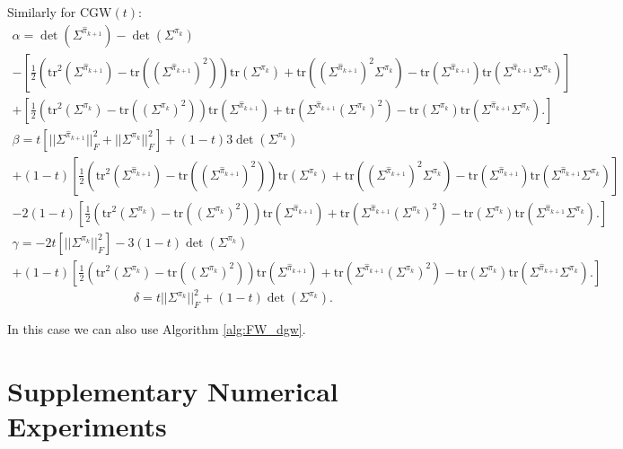 \documentclass{article}
\newcommand{\1}{\mathbf{1}}
\newcommand{\CGW}{\mathrm{CGW}}
\theoremstyle{definition}
\theoremstyle{remark}
\begin{document}
\begin{appendices}
Similarly for $\CGW(t)$:
\begin{multline*}
    \alpha = \det(\Sigma^{\hat{\pi}_{k+1}}) - \det(\Sigma^{\pi_{k}}) \\-\left[\frac{1}{2}(\mathrm{tr}^2(\Sigma^{\hat{\pi}_{k+1}})-\mathrm{tr}((\Sigma^{\hat{\pi}_{k+1}})^2))\mathrm{tr}(\Sigma^{\pi_{k}})+\mathrm{tr}((\Sigma^{\hat{\pi}_{k+1}})^2 \Sigma^{\pi_{k}})-\mathrm{tr}(\Sigma^{\hat{\pi}_{k+1}})\mathrm{tr}(\Sigma^{\hat{\pi}_{k+1}}\Sigma^{\pi_{k}})\right] \\+\left[\frac{1}{2}(\mathrm{tr}^2(\Sigma^{\pi_{k}})-\mathrm{tr}((\Sigma^{\pi_{k}})^2))\mathrm{tr}(\Sigma^{\hat{\pi}_{k+1}})+\mathrm{tr}(\Sigma^{\hat{\pi}_{k+1}}(\Sigma^{\pi_{k}})^2) - \mathrm{tr}(\Sigma^{\pi_{k}})\mathrm{tr}(\Sigma^{\hat{\pi}_{k+1}}\Sigma^{\pi_{k}}).\right]
\end{multline*}
\begin{multline*}
    \beta =  t[||\Sigma^{\hat{\pi}_{k+1}}||_F^2+||\Sigma^{\pi_{k}}||_F^2]+(1-t)
    3\det(\Sigma^{\pi_{k}}) \\
    +(1-t)\left[\frac{1}{2}(\mathrm{tr}^2(\Sigma^{\hat{\pi}_{k+1}})-\mathrm{tr}((\Sigma^{\hat{\pi}_{k+1}})^2))\mathrm{tr}(\Sigma^{\pi_{k}})+\mathrm{tr}((\Sigma^{\hat{\pi}_{k+1}})^2 \Sigma^{\pi_{k}})-\mathrm{tr}(\Sigma^{\hat{\pi}_{k+1}})\mathrm{tr}(\Sigma^{\hat{\pi}_{k+1}}\Sigma^{\pi_{k}})\right] \\
    -2(1-t)\left[\frac{1}{2}(\mathrm{tr}^2(\Sigma^{\pi_{k}})-\mathrm{tr}((\Sigma^{\pi_{k}})^2))\mathrm{tr}(\Sigma^{\hat{\pi}_{k+1}})+\mathrm{tr}(\Sigma^{\hat{\pi}_{k+1}}(\Sigma^{\pi_{k}})^2) - \mathrm{tr}(\Sigma^{\pi_{k}})\mathrm{tr}(\Sigma^{\hat{\pi}_{k+1}}\Sigma^{\pi_{k}}).\right]
\end{multline*}
\begin{multline*}
    \gamma = -2t[||\Sigma^{\pi_{k}}||_F^2]-3(1-t)
    \det(\Sigma^{\pi_{k}}) \\+(1-t)
    \left[\frac{1}{2}(\mathrm{tr}^2(\Sigma^{\pi_{k}})-\mathrm{tr}((\Sigma^{\pi_{k}})^2))\mathrm{tr}(\Sigma^{\hat{\pi}_{k+1}})+\mathrm{tr}(\Sigma^{\hat{\pi}_{k+1}}(\Sigma^{\pi_{k}})^2) - \mathrm{tr}(\Sigma^{\pi_{k}})\mathrm{tr}(\Sigma^{\hat{\pi}_{k+1}}\Sigma^{\pi_{k}}).\right]
\end{multline*}
\begin{equation*}
    \delta = 
    t||\Sigma^{\pi_{k}}||_F^2+(1-t)\det(\Sigma^{\pi_{k}}).
\end{equation*}

In this case we can also use Algorithm \ref{alg:FW_dgw}.
\newpage

\section{Supplementary Numerical Experiments}\label{sec:supp_num_exp}



\end{appendices}
\end{document}
